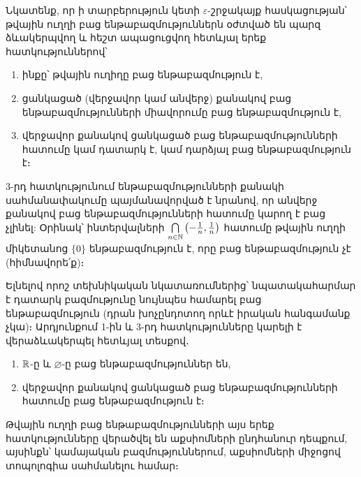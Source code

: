 \documentclass[./main.tex]{subfiles}
\begin{document}
\par Նկատենք, որ ի տարբերություն կետի $\varepsilon$-շրջակայք հասկացության՝ թվային ուղղի բաց ենթաբազմություններն օժտված են պարզ ձևակերպվող և հեշտ ապացուցվող հետևյալ երեք հատկություններով՝
\begin{enumerate}
    \item ինքը՝ թվային ուղիղը բաց ենթաբազմություն է,
    \item ցանկացած (վերջավոր կամ անվերջ) քանակով բաց ենթաբազմությունների միավորումը բաց ենթաբազմություն է,
    \item վերջավոր քանակով ցանկացած բաց ենթաբազմությունների հատումը կամ դա\-տարկ է, կամ դարձյալ բաց ենթաբազմություն է։
\end{enumerate}

\par $3$-րդ հատկությունում ենթաբազմությունների քանակի սահմանափակումը պայ\-մանավորված է նրանով, որ անվերջ քանակով բաց ենթաբազմությունների հատու\-մը կարող է բաց չլինել: Օրինակ՝ ինտերվալների $\bigcap\limits_{n \in \mathbb{N}} \left(-\frac{1}{n}, \frac{1}{n}\right)$ հատումը թվային ուղղի միկետանոց $\{0\}$ ենթաբազմություն է, որը բաց ենթաբազմություն չէ (հիմնավորե՛ք)։

\par Ելնելով որոշ տեխնիկական նկատառումներից՝ նպատակահարմար է դատարկ բազմությունը նույնպես համարել բաց ենթաբազմություն (դրան խոչընդոտող որևէ իրական հանգամանք չկա)։ Արդյունքում 1-ին և 3-րդ հատկությունները կարելի է վերաձևակերպել հետևյալ տեսքով․

\begin{enumerate}
    \item $\mathbb{R}$-ը և  $\varnothing$-ը բաց ենթաբազմություններ են,
    \item[3.] վերջավոր քանակով ցանկացած բաց ենթաբազմությունների հատումը բաց ենթաբազմություն է։
\end{enumerate}

\par Թվային ուղղի բաց ենթաբազմությունների այս երեք հատկությունները վերած\-վել են աքսիոմների ընդհանուր դեպքում, այսինքն՝ կամայական բազմություններում, աքսի\-ոմ\-ների միջոցով տոպոլոգիա սահմանելու համար։
\end{document}
